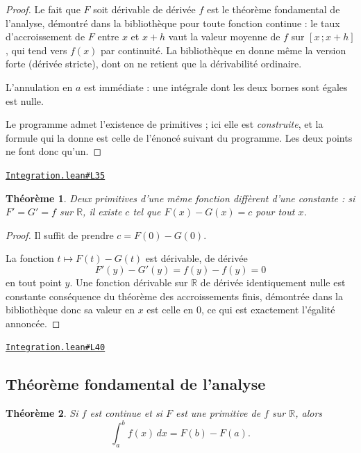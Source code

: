 \documentclass[11pt,a4paper]{article}
\theoremstyle{definition}
\theoremstyle{plain}
\newtheorem{theoreme}{Théorème}
\newcommand{\source}[2]{\par\smallskip\noindent\hfill{\footnotesize\href{#1}{\texttt{#2}}}\par\smallskip}
\begin{document}
\begin{proof}
Le fait que $F$ soit dérivable de dérivée $f$ est le théorème fondamental de l'analyse,
démontré dans la bibliothèque pour toute fonction continue : le taux d'accroissement de
$F$ entre $x$ et $x + h$ vaut la valeur moyenne de $f$ sur $[x\,;x+h]$, qui tend vers
$f(x)$ par continuité. La bibliothèque en donne même la version forte (dérivée stricte),
dont on ne retient que la dérivabilité ordinaire.

L'annulation en $a$ est immédiate : une intégrale dont les deux bornes sont égales est
nulle.

\medskip\noindent
Le programme admet l'existence de primitives ; ici elle est \emph{construite}, et la
formule qui la donne est celle de l'énoncé suivant du programme. Les deux points ne font
donc qu'un.
\end{proof}
\source{https://github.com/Commutator-IO/learn-lean/blob/main/courses/02-lycee/06-integration/Integration.lean\#L35}{Integration.lean\#L35}

\begin{theoreme}
Deux primitives d'une même fonction diffèrent d'une constante : si $F' = G' = f$ sur
$\mathbb{R}$, il existe $c$ tel que $F(x) - G(x) = c$ pour tout $x$.
\end{theoreme}

\begin{proof}
Il suffit de prendre $c = F(0) - G(0)$.

La fonction $t \mapsto F(t) - G(t)$ est dérivable, de dérivée
\[ F'(y) - G'(y) = f(y) - f(y) = 0 \]
en tout point $y$. Une fonction dérivable sur $\mathbb{R}$ de dérivée identiquement nulle
est constante \textemdash{} conséquence du théorème des accroissements finis, démontrée
dans la bibliothèque \textemdash{} donc sa valeur en $x$ est celle en $0$, ce qui est
exactement l'égalité annoncée.
\end{proof}
\source{https://github.com/Commutator-IO/learn-lean/blob/main/courses/02-lycee/06-integration/Integration.lean\#L40}{Integration.lean\#L40}

\subsection{Théorème fondamental de l'analyse}

\begin{theoreme}
Si $f$ est continue et si $F$ est une primitive de $f$ sur $\mathbb{R}$, alors
\[ \int_a^b f(x)\,dx = F(b) - F(a) . \]
\end{theoreme}
\end{document}
